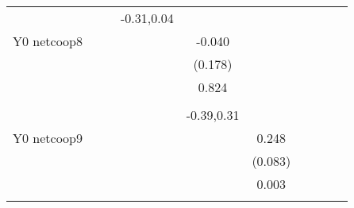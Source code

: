 \begin{table}[!h]
\begin{adjustbox}{width=\columnwidth,center}
\begin{tabular}{l*{8}{c}}
                    &                     &                     &  -0.31,0.04         &                     &                     &                     &                     &                     &                     &                     \\
Y0 netcoop8         &                     &                     &                     &      -0.040         &                     &                     &                     &                     &                     &                     \\
                    &                     &                     &                     &     (0.178)         &                     &                     &                     &                     &                     &                     \\
                    &                     &                     &                     &       0.824         &                     &                     &                     &                     &                     &                     \\
                    &                     &                     &                     &                     &                     &                     &                     &                     &                     &                     \\
                    &                     &                     &                     &  -0.39,0.31         &                     &                     &                     &                     &                     &                     \\
Y0 netcoop9         &                     &                     &                     &                     &       0.248\sym{***}&                     &                     &                     &                     &                     \\
                    &                     &                     &                     &                     &     (0.083)         &                     &                     &                     &                     &                     \\
                    &                     &                     &                     &                     &       0.003         &                     &                     &                     &                     &                     \\
                    &                     &                     &                     &                     &                     &                     &                     &                     &                     &                     \\

\end{tabular}
\end{adjustbox}
\end{table}
